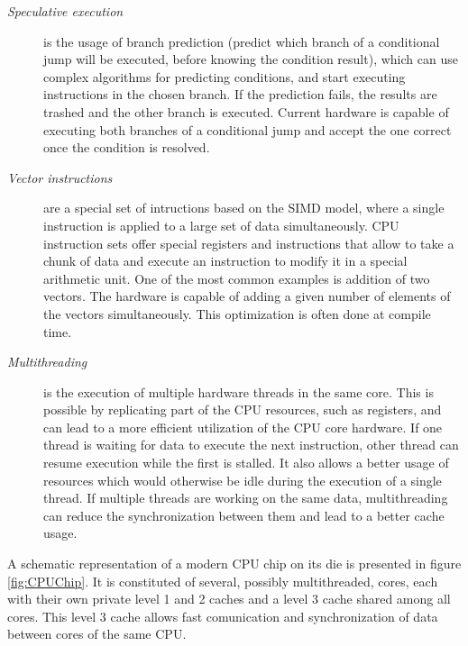 \begin{description}
\begin{description}
	\end{description}
	\item[\textit{Speculative execution}] is the usage of branch prediction (predict which branch of a conditional jump will be executed, before knowing the condition result), which can use complex algorithms for predicting conditions, and start executing instructions in the chosen branch. If the prediction fails, the results are trashed and the other branch is executed. Current hardware is capable of executing both branches of a conditional jump and accept the one correct once the condition is resolved.
	\item[\textit{Vector instructions}] are a special set of intructions based on the SIMD model, where a single instruction is applied to a large set of data simultaneously. CPU instruction sets offer special registers and instructions that allow to take a chunk of data and execute an instruction to modify it in a special arithmetic unit. One of the most common examples is addition of two vectors. The hardware is capable of adding a given number of elements of the vectors simultaneously. This optimization is often done at compile time.
	\item[\textit{Multithreading}] is the execution of multiple hardware threads in the same core. This is possible by replicating part of the CPU resources, such as registers, and can lead to a more efficient utilization of the CPU core hardware. If one thread is waiting for data to execute the next instruction, other thread can resume execution while the first is stalled. It also allows a better usage of resources which would otherwise be idle during the execution of a single thread. If multiple threads are working on the same data, multithreading can reduce the synchronization between them and lead to a better cache usage.
\end{description}

A schematic representation of a modern CPU chip on its die is presented in figure \ref{fig:CPUChip}. It is constituted of several, possibly multithreaded, cores, each with their own private level 1 and 2 caches and a level 3 cache shared among all cores. This level 3 cache allows fast comunication and synchronization of data between cores of the same CPU.

